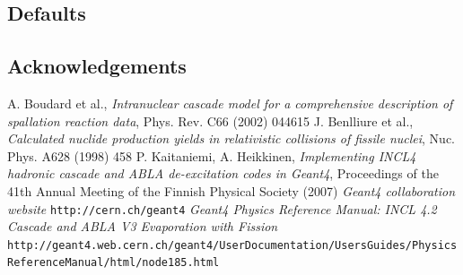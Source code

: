 \documentclass[20pt]{article}
\newenvironment{textbox}
{\begin{lrbox}{\dummybox}\begin{minipage}{0.9\columnwidth}}
{\end{minipage}\end{lrbox}\raisebox{-\depth}{\psshadowbox[framesep=1em,framearc=.1,shadow=true]{\usebox{\dummybox}}}\vspace{0.005\textheight}}
\begin{document}
\begin{center}
\begin{multicols}{3}
\begin{textbox}
\end{textbox}
\begin{textbox}


\section*{\color{udsect} Defaults}
 
 
\end{textbox}
\begin{textbox}


\section*{\color{udsect} Acknowledgements}



\end{textbox}
\begin{textbox}

{\small
{}
\begin{thebibliography}{9}
 A. Boudard et al., \emph{Intranuclear cascade model for
    a comprehensive description of spallation reaction data}, Phys.
  Rev. C66 (2002) 044615
 J. Benlliure et al., \emph{Calculated nuclide
    production yields in relativistic collisions of fissile nuclei},
  Nuc. Phys. A628 (1998) 458
 P. Kaitaniemi, A. Heikkinen, \emph{Implementing INCL4
    hadronic cascade and ABLA de-excitation codes in Geant4},
  Proceedings of the 41th Annual Meeting of the Finnish Physical
  Society (2007)
 \emph{Geant4 collaboration website} {\tt http://\-cern.ch/\-geant4}
 \emph{Geant4 Physics Reference Manual: INCL 4.2 Cascade and ABLA V3 Evaporation with Fission} {\tt http://geant4.web.cern.ch/\-geant4/\-UserDocumentation/\-UsersGuides/\-PhysicsReferenceManual/\-html/\-node185.html}
%
%
\end{thebibliography}
}

\end{textbox}

\end{multicols}

\end{center}
\end{document}

